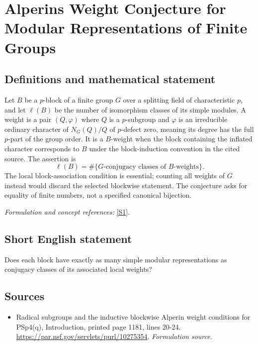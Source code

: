 \documentclass[11pt]{article}
\begin{document}
\section*{\texorpdfstring{Alperins Weight Conjecture for Modular Representations of Finite Groups}{Alperins Weight Conjecture for Modular Representations of Finite Groups}}\label{30006871}
\subsection{Definitions and mathematical statement}
Let $B$ be a $p$-block of a finite group $G$ over a splitting field of characteristic $p$, and let $\ell(B)$ be the number of isomorphism classes of its simple modules. A weight is a pair $(Q,\varphi)$ where $Q$ is a $p$-subgroup and $\varphi$ is an irreducible ordinary character of $N_G(Q)/Q$ of $p$-defect zero, meaning its degree has the full $p$-part of the group order. It is a $B$-weight when the block containing the inflated character corresponds to $B$ under the block-induction convention in the cited source. The assertion is
\[
 \ell(B)=\#\{G\text{-conjugacy classes of }B\text{-weights}\}.
\]
The local block-association condition is essential; counting all weights of $G$ instead would discard the selected blockwise statement. The conjecture asks for equality of finite numbers, not a specified canonical bijection.
\par\smallskip\textit{Formulation and concept references:} \href{https://par.nsf.gov/servlets/purl/10275354}{[S1]}.

\subsection{Short English statement}
Does each block have exactly as many simple modular representations as conjugacy classes of its associated local weights?
\subsection{Sources}
\begin{itemize}
\item[S1]Radical subgroups and the inductive blockwise Alperin weight conditions for PSp4(q), Introduction, printed page 1181, lines 20-24.
\url{https://par.nsf.gov/servlets/purl/10275354}.
\textit{Formulation source.}
\end{itemize}
\end{document}
